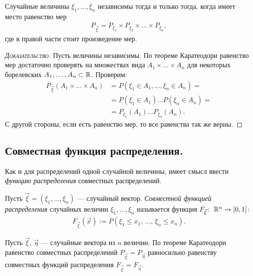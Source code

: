 \documentclass[../main.tex]{subfiles}
\begin{document}
\begin{thm}
 \label{theorem:random_variable_independence_through_distribution_measure_eq}
 Случайные величины $ \xi_1, \ldots, \xi_n $ независимы тогда и только тогда, когда имеет место равенство мер
 \begin{align}
  \label{equation:random_variable_independence_through_distribution_measure_eq}
  P_{\vec\xi} = P_{\xi_1} \times P_{\xi_2} \times \ldots \times P_{\xi_n},
 \end{align} где в правой части стоит произведение мер.
\end{thm}
\begin{proof}[\normalfont\textsc{Доказательство}]
 Пусть величины независимы. По теореме Каратеодори равенство мер достаточно проверять на множествах вида $ A_1 \times \ldots \times A_n $ для некоторых борелевских $ A_1, \ldots, A_n \subset \mathbb{R} $. Проверим:
 \begin{align*}
  P_{\vec\xi}(A_1 \times \ldots \times A_n) &= P(\xi_1 \in A_1, \ldots, \xi_n \in A_n) =  \\
  &= P(\xi_1 \in A_1) \ldots P(\xi_n \in A_n) = \\
  &= P_{\xi_1}(A_1) \ldots P_{\xi_n}(A_n).
 \end{align*} С другой стороны, если есть равенство мер, то все равенства так же верны.
\end{proof}

\subsection{Совместная функция распределения.}

Как и для распределений одной случайной величины, имеет смысл ввести \textit{функцию распределения} совместных распределений. 

\begin{df} Пусть $ \vec\xi = (\xi_1, \ldots, \xi_n) $ --- случайный вектор. \textit{Совместной функцией распределения} случайных величин $ \xi_1, \ldots, \xi_n $ называется функция $ F_{\vec\xi} \colon\;\mathbb{R}^{n}\to[0,1] $:
 \begin{align*}
  F_{\vec\xi}(\vec x) := P(\xi_1 \leqslant x_1,\, \ldots,\, \xi_n \leqslant x_n).
 \end{align*} 
\end{df}

\begin{remrk}
 Пусть $ \vec\xi $, $ \vec\eta $ --- случайные вектора из $ n $ величин. По теореме Каратеодори равенство совместных распределений $ P_{\vec\xi} = P_{\vec\eta} $ равносильно равенству совместных функций распределения $ F_{\vec\xi} = F_{\vec\eta} $.
\end{remrk}
\end{document}
